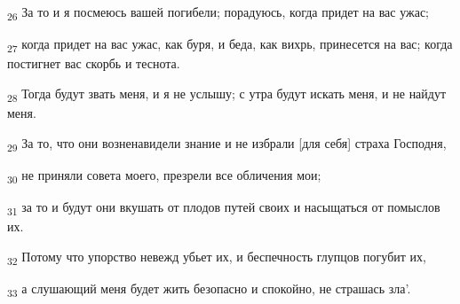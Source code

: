 \begin{tcolorbox}
\textsubscript{26} За то и я посмеюсь вашей погибели; порадуюсь, когда придет на вас ужас;
\end{tcolorbox}
\begin{tcolorbox}
\textsubscript{27} когда придет на вас ужас, как буря, и беда, как вихрь, принесется на вас; когда постигнет вас скорбь и теснота.
\end{tcolorbox}
\begin{tcolorbox}
\textsubscript{28} Тогда будут звать меня, и я не услышу; с утра будут искать меня, и не найдут меня.
\end{tcolorbox}
\begin{tcolorbox}
\textsubscript{29} За то, что они возненавидели знание и не избрали [для себя] страха Господня,
\end{tcolorbox}
\begin{tcolorbox}
\textsubscript{30} не приняли совета моего, презрели все обличения мои;
\end{tcolorbox}
\begin{tcolorbox}
\textsubscript{31} за то и будут они вкушать от плодов путей своих и насыщаться от помыслов их.
\end{tcolorbox}
\begin{tcolorbox}
\textsubscript{32} Потому что упорство невежд убьет их, и беспечность глупцов погубит их,
\end{tcolorbox}
\begin{tcolorbox}
\textsubscript{33} а слушающий меня будет жить безопасно и спокойно, не страшась зла'.
\end{tcolorbox}
